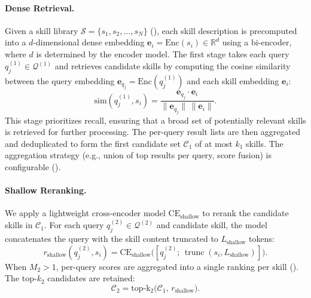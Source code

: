 \documentclass[11pt]{article}
\begin{document}
\paragraph{Dense Retrieval.}
Given a skill library $\mathcal{S} = \{s_1, s_2, \ldots, s_N\}$ (), each skill description is precomputed into a $d$-dimensional dense embedding $\mathbf{e}_i = \text{Enc}(s_i) \in \mathbb{R}^d$ using a bi-encoder, where $d$ is determined by the encoder model.
The first stage takes each query $q^{(1)}_j \in \mathcal{Q}^{(1)}$ and retrieves candidate skills by computing the cosine similarity between the query embedding $\mathbf{e}_{q_j} = \text{Enc}(q^{(1)}_j)$ and each skill embedding $\mathbf{e}_i$:
\begin{equation}
  \text{sim}(q^{(1)}_j, s_i) = \frac{\mathbf{e}_{q_j} \cdot \mathbf{e}_i}{\|\mathbf{e}_{q_j}\| \, \|\mathbf{e}_i\|}.
\end{equation}
This stage prioritizes recall, ensuring that a broad set of potentially relevant skills is retrieved for further processing.
The per-query result lists are then aggregated and deduplicated to form the first candidate set $\mathcal{C}_1$ of at most $k_1$ skills.
The aggregation strategy (e.g., union of top results per query, score fusion) is configurable ().

\paragraph{Shallow Reranking.}
We apply a lightweight cross-encoder model $\text{CE}_{\text{shallow}}$ to rerank the candidate skills in $\mathcal{C}_1$.
For each query $q^{(2)}_j \in \mathcal{Q}^{(2)}$ and candidate skill, the model concatenates the query with the skill content truncated to $L_{\text{shallow}}$ tokens:
\begin{equation}
  r_{\text{shallow}}(q^{(2)}_j, s_i) = \text{CE}_{\text{shallow}}\!\bigl([q^{(2)}_j;\, \operatorname{trunc}(s_i, L_{\text{shallow}})]\bigr).
\end{equation}
When $M_2 > 1$, per-query scores are aggregated into a single ranking per skill ().
The top-$k_2$ candidates are retained:
\begin{equation}
  \mathcal{C}_2 = \operatorname{top\text{-}k_2}\!\bigl(\mathcal{C}_1,\, r_{\text{shallow}}\bigr).
\end{equation}
\end{document}
